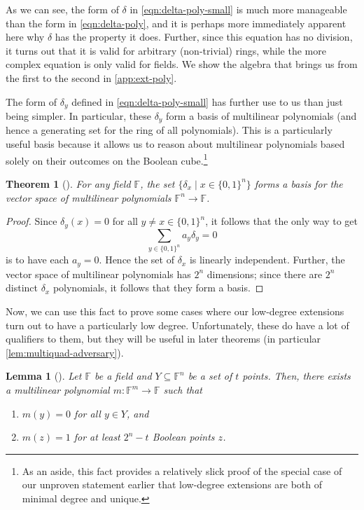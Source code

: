\documentclass[english,12pt]{reedthesis}
\theoremstyle{plain}
\newtheorem{thm}{Theorem}[section]
\newtheorem{lemma}[lemma]{Lemma}
\theoremstyle{definition}
\theoremstyle{remark}
\begin{document}
As we can see, the form of $\delta$ in \cref{eqn:delta-poly-small} is much more
manageable than the form in \cref{eqn:delta-poly}, and it is perhaps more
immediately apparent here why $\delta$ has the property it does. Further, since this
equation has no division, it turns out that it is valid for arbitrary
(non-trivial) rings, while the more complex equation is only valid for fields.
We show the algebra that brings us from the first to the second in
\cref{app:ext-poly}.

The form of $\delta_{y}$ defined in \cref{eqn:delta-poly-small} has further use to us
than just being simpler. In particular, these $\delta_{y}$ form a basis of
multilinear polynomials (and hence a generating set for the ring of all
polynomials). This is a particularly useful basis because it allows us to reason
about multilinear polynomials based solely on their outcomes on the Boolean
cube.\footnote{As an aside, this fact provides a relatively slick proof of the
  special case of our unproven statement earlier that low-degree extensions are
  both of minimal degree and unique.}

\begin{thm}[{\cite[]{AW09}}]\label{thm:delta-poly-basis}
  For any field $\mathbb{F}$, the set $\{\delta_{x} \mid x \in \{0, 1\}^{n}\}$ forms a
  basis for the vector space of multilinear polynomials
  $\mathbb{F}^{n} \rightarrow \mathbb{F}$.
\end{thm}

\begin{proof}
  Since $\delta_{y}(x) = 0$ for all $y \ne x \in \{0, 1\}^{n}$, it follows that the only
  way to get
  \begin{equation}
    \sum_{y \in \{0, 1\}^{n}}a_{y}\delta_{y} = 0
  \end{equation}
  is to have each $a_{y} = 0$. Hence the set of $\delta_{x}$ is linearly independent.
  Further, the vector space of multilinear polynomials has $2^{n}$ dimensions;
  since there are $2^{n}$ distinct $\delta_{x}$ polynomials, it follows that they
  form a basis.
\end{proof}

Now, we can use this fact to prove some cases where our low-degree extensions
turn out to have a particularly low degree. Unfortunately, these do have a lot
of qualifiers to them, but they will be useful in later theorems (in particular
\cref{lem:multiquad-adversary}).

\begin{lemma}[{\cite[Lemma 4.2]{AW09}}]\label{thm:multilin-extension}
  Let $\mathbb{F}$ be a field and $Y \subseteq \mathbb{F}^{n}$ be a set of $t$ points.
  Then, there exists a multilinear polynomial $m: \mathbb{F}^{m} \rightarrow \mathbb{F}$
  such that
  \begin{enumerate}
    \item $m(y) = 0$ for all $y \in Y$, and
    \item $m(z) = 1$ for at least $2^{n} - t$ Boolean points $z$.
  \end{enumerate}
\end{lemma}
\end{document}
